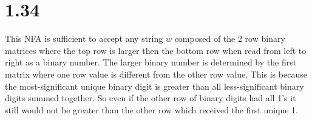 \documentclass{article}
\begin{document}
\newpage
\section*{1.34}
This NFA is sufficient to accept any string $w$ composed of the 2 row binary matrices where the top row is larger then the bottom row when read from left to right as a binary number. The larger binary number is determined by the first matrix where one row value is different from the other row value. This is because the most-significant unique binary digit is greater than all less-significant binary digits summed together. So even if the other row of binary digits had all 1's it still would not be greater than the other row which received the first unique 1.

\begin{center}
\end{center}
\end{document}
